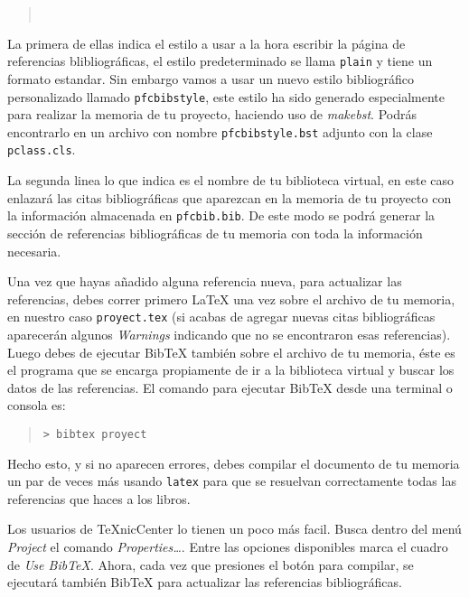 \begin{quote}
\begin{verbatim}


\end{verbatim}
\end{quote}

La primera de ellas indica el estilo a usar  a la hora escribir la p\'agina de referencias blibliogr\'aficas, 
el estilo predeterminado se llama \texttt{plain} y tiene un formato estandar. Sin embargo vamos a usar un nuevo
estilo bibliogr\'afico personalizado llamado \texttt{pfcbibstyle}, este estilo ha sido generado especialmente
para realizar la memoria de tu proyecto, haciendo uso de \emph{makebst}. Podr\'as encontrarlo en un archivo con nombre
\texttt{pfcbibstyle.bst} adjunto con la clase \texttt{pclass.cls}. 

La segunda linea lo que indica es el nombre de tu biblioteca virtual, en este caso enlazar\'a las citas
bibliogr\'aficas que aparezcan en la memoria de tu proyecto con la informaci\'on almacenada en \texttt{pfcbib.bib}.
De este modo se podr\'a generar la secci\'on de referencias bibliogr\'aficas de tu memoria con toda la informaci\'on
necesaria.

Una vez que hayas a\~nadido alguna referencia nueva, para actualizar las referencias, debes correr primero 
\LaTeX{} una vez sobre el archivo de tu memoria, en nuestro caso \texttt{proyect.tex} (si acabas de agregar 
nuevas citas bibliogr\'aficas aparecer\'an algunos \emph{Warnings} indicando que no se encontraron esas referencias). 
Luego debes de ejecutar Bib\TeX{} tambi\'en sobre el archivo de tu memoria, \'este es el programa que se encarga
propiamente de ir a la biblioteca virtual y buscar los datos de las referencias. El comando para ejecutar Bib\TeX{} 
desde una terminal o consola es:

\begin{quote}
\begin{verbatim}
> bibtex proyect
\end{verbatim}
\end{quote}

Hecho esto, y si no aparecen errores, debes compilar el documento de tu memoria un par de
veces m\'as usando \texttt{latex} para que se resuelvan correctamente todas las referencias
que haces a los libros.

Los usuarios de \TeX{}nicCenter lo tienen un poco m\'as facil. Busca dentro del men\'u
\emph{Project} el comando \emph{Properties\dots}. Entre las opciones disponibles
marca el cuadro de \emph{Use BibTeX}. Ahora, cada vez que presiones el bot\'on
para compilar, se ejecutar\'a tambi\'en Bib\TeX{} para actualizar las referencias
bibliogr\'aficas.



